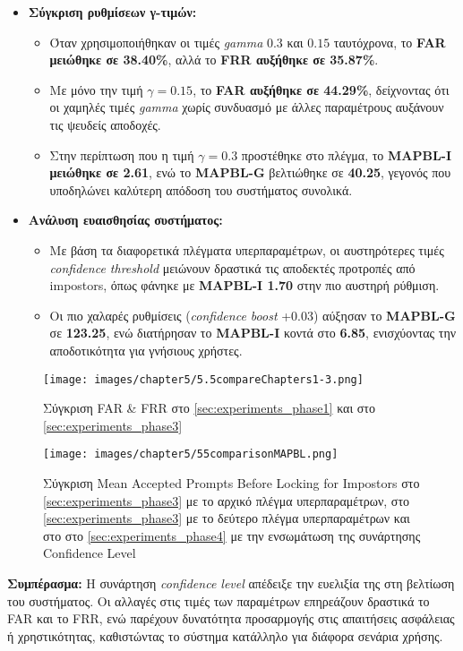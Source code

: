 \begin{itemize}
    \item \textbf{Σύγκριση ρυθμίσεων γ-τιμών:}
    \begin{itemize}
        \item Όταν χρησιμοποιήθηκαν οι τιμές \textit{gamma} \(0.3\) και \(0.15\) ταυτόχρονα, το \textbf{FAR μειώθηκε σε 38.40\%}, αλλά το \textbf{FRR αυξήθηκε σε 35.87\%}.
        \item Με μόνο την τιμή \(\gamma = 0.15\), το \textbf{FAR αυξήθηκε σε 44.29\%}, δείχνοντας ότι οι χαμηλές τιμές \textit{gamma} χωρίς συνδυασμό με άλλες παραμέτρους αυξάνουν τις ψευδείς αποδοχές.
        \item Στην περίπτωση που η τιμή \(\gamma = 0.3\) προστέθηκε στο πλέγμα, το \textbf{MAPBL-I μειώθηκε σε 2.61}, ενώ το \textbf{MAPBL-G} βελτιώθηκε σε \textbf{40.25}, γεγονός που υποδηλώνει καλύτερη απόδοση του συστήματος συνολικά.
    \end{itemize}

    \item \textbf{Ανάλυση ευαισθησίας συστήματος:}
    \begin{itemize}
        \item Με βάση τα διαφορετικά πλέγματα υπερπαραμέτρων, οι αυστηρότερες τιμές \textit{confidence threshold} μειώνουν δραστικά τις αποδεκτές προτροπές από impostors, όπως φάνηκε με \textbf{MAPBL-I 1.70} στην πιο αυστηρή ρύθμιση.
        \item Οι πιο χαλαρές ρυθμίσεις (\textit{confidence boost} +0.03) αύξησαν το \textbf{MAPBL-G} σε \textbf{123.25}, ενώ διατήρησαν το \textbf{MAPBL-I} κοντά στο \textbf{6.85}, ενισχύοντας την αποδοτικότητα για γνήσιους χρήστες.
    \end{itemize}
\end{itemize}

\begin{figure}[H]
    \centering
    \texttt{[image: images/chapter5/5.5compareChapters1-3.png]}
    \caption{Σύγκριση FAR \& FRR στο \autoref{sec:experiments_phase1} και στο \autoref{sec:experiments_phase3}}
    \label{fig:chapter5_image55comparisonChapters13}
\end{figure}

\begin{figure}[H]
    \centering
    \texttt{[image: images/chapter5/55comparisonMAPBL.png]}
    \caption{Σύγκριση Mean Accepted Prompts Before Locking for Impostors στο \autoref{sec:experiments_phase3} με το αρχικό πλέγμα υπερπαραμέτρων, στο \autoref{sec:experiments_phase3} με το δεύτερο πλέγμα υπερπαραμέτρων και στο στο \autoref{sec:experiments_phase4} με την ενσωμάτωση της συνάρτησης Confidence Level}
    \label{fig:chapter5_image55comparisonMAPBL}
\end{figure}

\textbf{Συμπέρασμα:} Η συνάρτηση \textit{confidence level} απέδειξε την ευελιξία της στη βελτίωση του συστήματος. Οι αλλαγές στις τιμές των παραμέτρων επηρεάζουν δραστικά το FAR και το FRR, ενώ παρέχουν δυνατότητα προσαρμογής στις απαιτήσεις ασφάλειας ή χρηστικότητας, καθιστώντας το σύστημα κατάλληλο για διάφορα σενάρια χρήσης.
